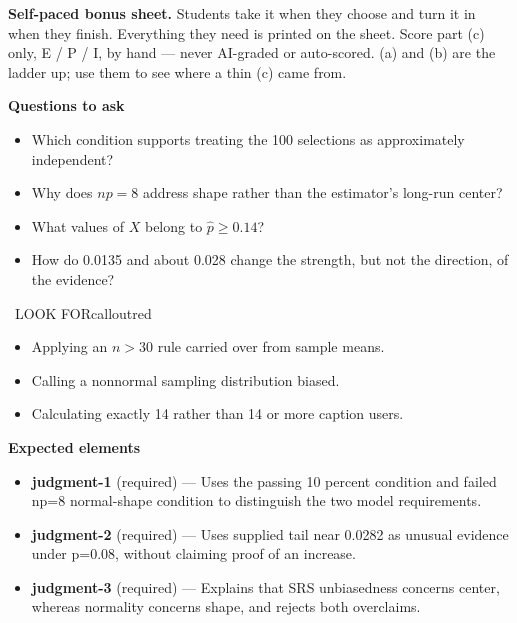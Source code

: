 \documentclass[11pt]{article}
\begin{document}
\textbf{Self-paced bonus sheet.} Students take it when they choose and turn it in when they finish. Everything they need is printed on the sheet. Score part (c) only, E / P / I, by hand --- never AI-graded or auto-scored. (a) and (b) are the ladder up; use them to see where a thin (c) came from.\par

\textbf{Questions to ask}
\begin{itemize}[leftmargin=1.5em,itemsep=2pt,topsep=2pt]
  \item Which condition supports treating the 100 selections as approximately independent?
  \item Why does $np=8$ address shape rather than the estimator's long-run center?
  \item What values of $X$ belong to $\widehat p\geq0.14$?
  \item How do 0.0135 and about 0.028 change the strength, but not the direction, of the evidence?
\end{itemize}

\begin{callout}{\IconWarn\ LOOK FOR}{calloutred}
\begin{itemize}[leftmargin=1.5em,itemsep=2pt,topsep=2pt]
  \item Applying an $n>30$ rule carried over from sample means.
  \item Calling a nonnormal sampling distribution biased.
  \item Calculating exactly 14 rather than 14 or more caption users.
\end{itemize}
\end{callout}


\textbf{Expected elements}
\begin{itemize}[leftmargin=1.5em,itemsep=2pt,topsep=2pt]
  \item \textbf{judgment-1} (required) --- Uses the passing 10 percent condition and failed np=8 normal-shape condition to distinguish the two model requirements.
  \item \textbf{judgment-2} (required) --- Uses supplied tail near 0.0282 as unusual evidence under p=0.08, without claiming proof of an increase.
  \item \textbf{judgment-3} (required) --- Explains that SRS unbiasedness concerns center, whereas normality concerns shape, and rejects both overclaims.
\end{itemize}
\end{document}
